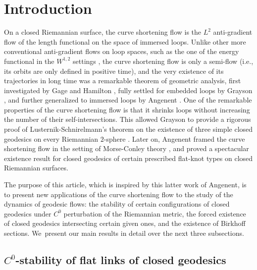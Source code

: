 \documentclass[11pt]{article}
\newcommand{\ie}{i.e.,\xspace}
\theoremstyle{plain}
\theoremstyle{definition}
\begin{document}
\section{Introduction}

On a closed Riemannian surface, the curve shortening flow is the $L^2$ anti-gradient flow of the length functional on the space of immersed loops. Unlike other more conventional anti-gradient flows on loop spaces, such as the one of the energy functional in the $W^{1,2}$ settings \cite{Klingenberg:1978aa}, the curve shortening flow is only a semi-flow (\ie its orbits are only defined in positive time), and the very existence of its trajectories in long time was a remarkable theorem of geometric analysis, first investigated by Gage \cite{Gage:1983aa,Gage:1984aa, Gage:1990aa} and Hamilton \cite{Gage:1986aa}, fully settled for embedded loops by Grayson \cite{Grayson:1989aa}, and further generalized to immersed loops by Angenent \cite{Angenent:1990aa, Angenent:1991aa}. One of the remarkable properties of the curve shortening flow is that it shrinks loops without increasing the number of their self-intersections. This allowed Grayson to provide a rigorous proof of Lusternik-Schnirelmann's theorem on the existence of three simple closed geodesics on every Riemannian $2$-sphere \cite{Grayson:1989aa, Mazzucchelli:2018aa}. Later on, Angenent \cite{Angenent:2005aa} framed the curve shortening flow in the setting of Morse-Conley theory \cite{Conley:1978aa}, and proved a spectacular existence result for closed geodesics of certain prescribed flat-knot types on closed Riemannian surfaces.

The purpose of this article, which is inspired by this latter work of Angenent, is to present new applications of the curve shortening flow to the study of the dynamics of geodesic flows: the stability of certain configurations of closed geodesics under $C^0$ perturbation of the Riemannian metric, the forced existence of closed geodesics intersecting certain given ones, and the existence of Birkhoff sections. We~present our main results in detail over the next three subsections.

\subsection{$C^0$-stability of flat links of closed geodesics}\label{ss:C0_stability}
\end{document}
